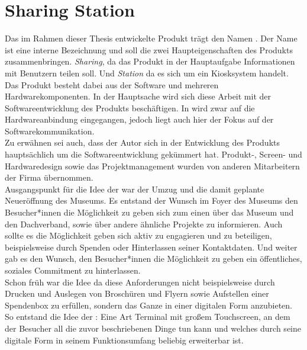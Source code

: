 \section{Sharing Station}
\label{section:sharing-station}

Das im Rahmen dieser Thesis entwickelte Produkt trägt den Namen \shst{}. Der Name 
ist eine interne Bezeichnung und soll die zwei Haupteigenschaften des Produkts zusammenbringen.
\emph{Sharing}, da das Produkt in der Hauptaufgabe Informationen mit Benutzern teilen soll. 
Und \emph{Station} da es sich um ein Kiosksystem handelt.\\

Das Produkt besteht dabei aus der Software und mehreren Hardwarekomponenten. In der Hauptsache
wird sich diese Arbeit mit der Softwareentwicklung des Produkts beschäftigen. In  wird zwar
auf die Hardwareanbindung eingegangen, jedoch liegt auch hier der Fokus auf der Softwarekommunikation.\\
Zu erwähnen sei auch, dass der Autor sich in der Entwicklung des Produkts hauptsächlich um die Softwareentwicklung 
gekümmert hat. Produkt-, Screen- und Hardwaredesign sowie das Projektmanagement wurden von anderen Mitarbeitern
der Firma \meso{} übernommen.\\

Ausgangspunkt für die Idee der \shst{} war der Umzug und die damit geplante Neueröffnung des Museums.
Es entstand der Wunsch im Foyer des Museums den Besucher*innen die Möglichkeit zu geben sich zum einen 
über das Museum und den Dachverband, sowie über andere ähnliche Projekte zu informieren. Auch sollte
es die Möglichkeit geben sich aktiv zu engagieren und zu beteiligen, beispielsweise durch Spenden oder 
Hinterlassen seiner Kontaktdaten. Und weiter gab es den Wunsch, den Besucher*innen die Möglichkeit zu geben ein 
öffentliches, soziales Commitment zu hinterlassen.\\
Schon früh war die Idee da diese Anforderungen nicht beispielsweise durch Drucken und Auslegen von 
Broschüren und Flyern sowie Aufstellen einer Spendenbox zu erfüllen, sondern das Ganze in einer digitalen
Form anzubieten. So entstand die Idee der \shst{}: Eine Art Terminal mit großem Touchscreen, an dem der Besucher 
all die zuvor beschriebenen Dinge tun kann und welches durch seine digitale Form in seinem Funktionsumfang
beliebig erweiterbar ist.
